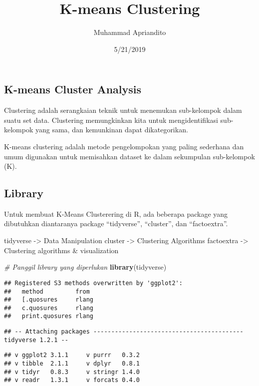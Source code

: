 \documentclass[]{article}
\title{K-means Clustering}
\author{Muhammad Apriandito}
\date{5/21/2019}
\newenvironment{Shaded}{\begin{snugshade}}{\end{snugshade}}
\newcommand{\CommentTok}[1]{\textcolor[rgb]{0.56,0.35,0.01}{\textit{#1}}}
\newcommand{\KeywordTok}[1]{\textcolor[rgb]{0.13,0.29,0.53}{\textbf{#1}}}
\newcommand{\NormalTok}[1]{#1}
\begin{document}
\maketitle

\hypertarget{k-means-cluster-analysis}{%
\subsection{K-means Cluster Analysis}\label{k-means-cluster-analysis}}

Clustering adalah serangkaian teknik untuk menemukan sub-kelompok dalam
suatu set data. Clustering memungkinkan kita untuk mengidentifikasi
sub-kelompok yang sama, dan kemunkinan dapat dikategorikan.

K-means clustering adalah metode pengelompokan yang paling sederhana dan
umum digunakan untuk memisahkan dataset ke dalam sekumpulan sub-kelompok
(K).

\hypertarget{library}{%
\subsection{Library}\label{library}}

Untuk membuat K-Means Clusterering di R, ada beberapa package yang
dibutuhkan diantaranya package ``tidyverse'', ``cluster'', dan
``factoextra''.

tidyverse -\textgreater{} Data Manipulation cluster -\textgreater{}
Clustering Algorithms factoextra -\textgreater{} Clustering algorithms
\& visualization

\begin{Shaded}
\begin{Highlighting}[]
\CommentTok{# Panggil library yang diperlukan}
\KeywordTok{library}\NormalTok{(tidyverse)}
\end{Highlighting}
\end{Shaded}

\begin{verbatim}
## Registered S3 methods overwritten by 'ggplot2':
##   method         from 
##   [.quosures     rlang
##   c.quosures     rlang
##   print.quosures rlang
\end{verbatim}

\begin{verbatim}
## -- Attaching packages ------------------------------------------ tidyverse 1.2.1 --
\end{verbatim}

\begin{verbatim}
## v ggplot2 3.1.1     v purrr   0.3.2
## v tibble  2.1.1     v dplyr   0.8.1
## v tidyr   0.8.3     v stringr 1.4.0
## v readr   1.3.1     v forcats 0.4.0
\end{verbatim}
\end{document}
